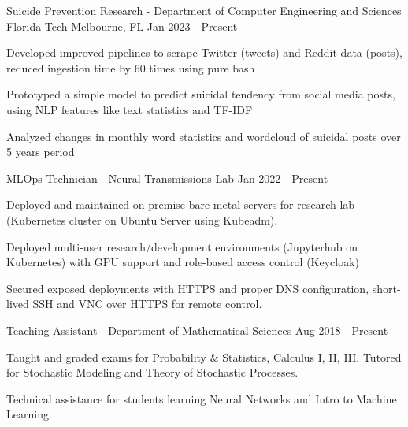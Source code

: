 \begin{cventries}
	\cventry
	{Suicide Prevention Research - Department of Computer Engineering and Sciences}
	{Florida Tech}
	{Melbourne, FL}
	{Jan 2023 - Present}
	{\begin{cvitems}
			\item {Developed improved pipelines to scrape Twitter (tweets) and Reddit data (posts), reduced ingestion time by 60 times using pure bash}
			\item {Prototyped a simple model to predict suicidal tendency from social media posts, using NLP features like text statistics and TF-IDF}
			\item {Analyzed changes in monthly word statistics and wordcloud of suicidal posts over 5 years period}
		\end{cvitems}}

	\vspace{-2mm}

	\cventry
	{MLOps Technician - Neural Transmissions Lab}
	{}
	{}
	{Jan 2022 - Present}
	{\begin{cvitems}
			\item {Deployed and maintained on-premise bare-metal servers for research lab (Kubernetes cluster on Ubuntu Server using Kubeadm).}
			\item {Deployed multi-user research/development environments (Jupyterhub on Kubernetes) with GPU support and role-based access control (Keycloak)}
			\item {Secured exposed deployments with HTTPS and proper DNS configuration, short-lived SSH and VNC over HTTPS for remote control.}
		\end{cvitems}}

	\vspace{-2mm}

	\cventry
	{Teaching Assistant - Department of Mathematical Sciences}
	{}
	{}
	{Aug 2018 - Present}
	{\begin{cvitems}
			\item {Taught and graded exams for Probability \& Statistics, Calculus I, II, III. Tutored for Stochastic Modeling and Theory of Stochastic Processes.}
			\item {Technical assistance for students learning Neural Networks and Intro to Machine Learning.}
		\end{cvitems}}


\end{cventries}
